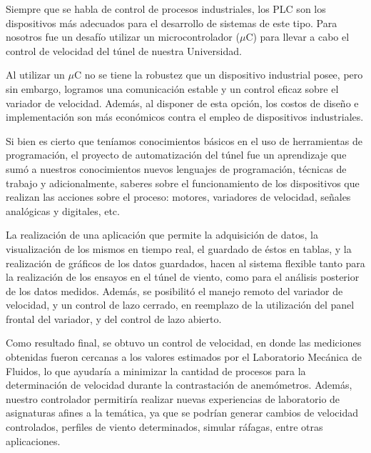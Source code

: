 Siempre que se habla de control de procesos industriales, los PLC son los dispositivos más adecuados para el desarrollo de sistemas de este tipo. Para nosotros fue un desafío utilizar un microcontrolador ($\mu$C) para llevar a cabo el control de velocidad del túnel de nuestra Universidad.

Al utilizar un $\mu$C no se tiene la robustez que un dispositivo industrial posee, pero sin embargo, logramos una comunicación estable y un control eficaz sobre el variador de velocidad. Además, al disponer de esta opción, los costos de diseño e implementación son más económicos contra el empleo de dispositivos industriales.

Si bien es cierto que teníamos conocimientos básicos en el uso de herramientas de programación, el proyecto de automatización del túnel fue un aprendizaje que sumó a nuestros conocimientos nuevos lenguajes de programación, técnicas de trabajo y adicionalmente, saberes sobre el funcionamiento de los dispositivos que realizan las acciones sobre el proceso: motores, variadores de velocidad, señales analógicas y digitales, etc. 

La realización de una aplicación que permite la adquisición de datos,  la visualización de los mismos en tiempo real, el guardado de éstos en tablas, y la realización de gráficos de los datos guardados, hacen al sistema flexible tanto para la realización de los ensayos en el túnel de viento, como para el análisis posterior de los datos medidos. Además, se posibilitó el manejo remoto del variador de velocidad, y un control de lazo cerrado, en reemplazo de la utilización del panel frontal del variador, y del control de lazo abierto.

Como resultado final, se obtuvo un control de velocidad, en donde las mediciones obtenidas fueron cercanas a los valores estimados por el Laboratorio Mecánica de Fluidos, lo que ayudaría a minimizar la cantidad de procesos para la determinación de velocidad durante la contrastación de anemómetros. Además, nuestro controlador permitiría realizar nuevas experiencias de laboratorio de asignaturas afines a la temática, ya que se podrían generar cambios de velocidad controlados, perfiles de viento determinados, simular ráfagas, entre otras aplicaciones.

